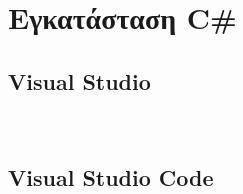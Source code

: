 \section{Εγκατάσταση C\#}

\subsection{Visual Studio}
\label{Visual Studio}
\

\subsection{Visual Studio Code}
\label{VS Code}
